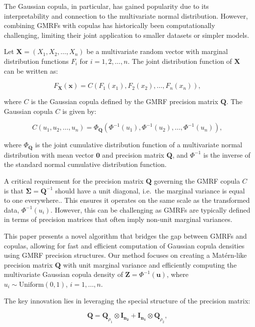 \documentclass[journal=,manuscript=]{achemso}
\begin{document}
The Gaussian copula, in particular, has gained popularity due to its
interpretability and connection to the multivariate normal distribution.
However, combining GMRFs with copulas has historically been
computationally challenging, limiting their joint application to smaller
datasets or simpler models.

Let \(\mathbf{X} = (X_1, X_2, \ldots, X_n)\) be a multivariate random
vector with marginal distribution functions \(F_i\) for
\(i = 1, 2, \ldots, n\). The joint distribution function of
\(\mathbf{X}\) can be written as:

\[
F_{\mathbf{X}}(\mathbf{x}) = C(F_1(x_1), F_2(x_2), \ldots, F_n(x_n)),
\]

where \(C\) is the Gaussian copula defined by the GMRF precision matrix
\(\mathbf{Q}\). The Gaussian copula \(C\) is given by:

\[
C(u_1, u_2, \ldots, u_n) = \Phi_\mathbf{Q}(\Phi^{-1}(u_1), \Phi^{-1}(u_2), \ldots, \Phi^{-1}(u_n)),
\]

where \(\Phi_\mathbf{Q}\) is the joint cumulative distribution function
of a multivariate normal distribution with mean vector \(\mathbf{0}\)
and precision matrix \(\mathbf{Q}\), and \(\Phi^{-1}\) is the inverse of
the standard normal cumulative distribution function.

A critical requirement for the precision matrix \(\mathbf{Q}\) governing
the GMRF copula \(C\) is that \(\mathbf{\Sigma} = \mathbf{Q}^{-1}\)
should have a unit diagonal, i.e.~the marginal variance is equal to one
everywhere.. This ensures it operates on the same scale as the
transformed data, \(\Phi^{-1}(u_i)\). However, this can be challenging
as GMRFs are typically defined in terms of precision matrices that often
imply non-unit marginal variances.

This paper presents a novel algorithm that bridges the gap between GMRFs
and copulas, allowing for fast and efficient computation of Gaussian
copula densities using GMRF precision structures. Our method focuses on
creating a Matérn-like precision matrix \(\mathbf{Q}\) with unit
marginal variance and efficiently computing the multivariate Gaussian
copula density of \(\mathbf{Z} = \Phi^{-1}(\mathbf{u})\), where
\(u_i \sim \text{Uniform}(0, 1)\), \(i = 1, \dots, n\).

The key innovation lies in leveraging the special structure of the
precision matrix:

\[
\mathbf{Q} = \mathbf{Q}_{\rho_1} \otimes \mathbf{I_{n_2}} + \mathbf{I_{n_1}} \otimes \mathbf{Q}_{\rho_2},
\]
\end{document}
